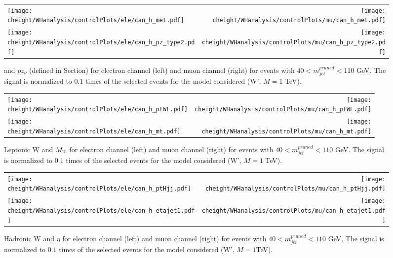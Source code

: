 \begin{figure}[h!bp]
\centering
\begin{tabular}{lr}
\texttt{[image: \\cheight/WHanalysis/controlPlots/ele/can\_h\_met.pdf]} &
\texttt{[image: \\cheight/WHanalysis/controlPlots/mu/can\_h\_met.pdf]} \\
\texttt{[image: \\cheight/WHanalysis/controlPlots/ele/can\_h\_pz\_type2.pdf]} &
\texttt{[image: \\cheight/WHanalysis/controlPlots/mu/can\_h\_pz\_type2.pdf]} \\
\end{tabular}
\caption{ \ETmiss and $pz_\nu$ (defined in Section) for electron channel (left) and muon channel (right) for events with $40 < m_{jet}^{pruned} < 110$ GeV. The signal is normalized to $0.1$ times of the selected events for the model considered (W', $M=1$ TeV).}
\label{fig:controlPlotsMETPz}
\end{figure}

\begin{figure}[h!bp]
\centering
\begin{tabular}{lr}
\texttt{[image: \\cheight/WHanalysis/controlPlots/ele/can\_h\_ptWL.pdf]} &
\texttt{[image: \\cheight/WHanalysis/controlPlots/mu/can\_h\_ptWL.pdf]} \\
\texttt{[image: \\cheight/WHanalysis/controlPlots/ele/can\_h\_mt.pdf]} &
\texttt{[image: \\cheight/WHanalysis/controlPlots/mu/can\_h\_mt.pdf]} \\
\end{tabular}
\caption{ Leptonic W \pt and $M_{\rm T}$ for electron channel (left) and muon channel (right) for events with $40 < m_{jet}^{pruned} < 110$ GeV. The signal is normalized to $0.1$ times of the selected events for the model considered (W', $M=1$ TeV).}
\label{fig:controlPlotsWLPtMT}
\end{figure}

\begin{figure}[h!bp]
\centering
\begin{tabular}{lr}
\texttt{[image: \\cheight/WHanalysis/controlPlots/ele/can\_h\_ptHjj.pdf]} &
\texttt{[image: \\cheight/WHanalysis/controlPlots/mu/can\_h\_ptHjj.pdf]} \\
\texttt{[image: \\cheight/WHanalysis/controlPlots/ele/can\_h\_etajet1.pdf]} &
\texttt{[image: \\cheight/WHanalysis/controlPlots/mu/can\_h\_etajet1.pdf]} \\
\end{tabular}
\caption{ Hadronic W \pt and $\eta$ for electron channel (left) and muon channel (right) for events with $40 < m_{jet}^{pruned} < 110$ GeV. The signal is normalized to $0.1$ times of the selected events for the model considered (W', $M=1$TeV).}
\label{fig:controlPlotsHHPtEta}
\end{figure}

